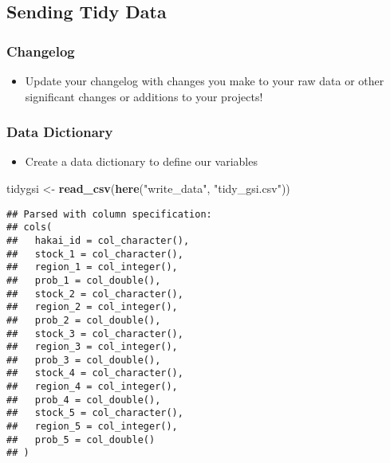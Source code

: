 \documentclass[]{article}
\newenvironment{Shaded}{\begin{snugshade}}{\end{snugshade}}
\newcommand{\KeywordTok}[1]{\textcolor[rgb]{0.13,0.29,0.53}{\textbf{#1}}}
\newcommand{\DataTypeTok}[1]{\textcolor[rgb]{0.13,0.29,0.53}{#1}}
\newcommand{\StringTok}[1]{\textcolor[rgb]{0.31,0.60,0.02}{#1}}
\newcommand{\OperatorTok}[1]{\textcolor[rgb]{0.81,0.36,0.00}{\textbf{#1}}}
\newcommand{\NormalTok}[1]{#1}
\providecommand{\tightlist}{%
  \setlength{\itemsep}{0pt}\setlength{\parskip}{0pt}}
\begin{document}
\begin{Shaded}
\end{Shaded}

\subsection{Sending Tidy Data}\label{sending-tidy-data}

\subsubsection{Changelog}\label{changelog}

\begin{itemize}
\tightlist
\item
  Update your changelog with changes you make to your raw data or other
  significant changes or additions to your projects!
\end{itemize}

\subsubsection{Data Dictionary}\label{data-dictionary}

\begin{itemize}
\tightlist
\item
  Create a data dictionary to define our variables
\end{itemize}

\begin{Shaded}
\begin{Highlighting}[]
\NormalTok{tidygsi <-}\StringTok{ }\KeywordTok{read_csv}\NormalTok{(}\KeywordTok{here}\NormalTok{(}\StringTok{"write_data"}\NormalTok{, }\StringTok{"tidy_gsi.csv"}\NormalTok{))}
\end{Highlighting}
\end{Shaded}

\begin{verbatim}
## Parsed with column specification:
## cols(
##   hakai_id = col_character(),
##   stock_1 = col_character(),
##   region_1 = col_integer(),
##   prob_1 = col_double(),
##   stock_2 = col_character(),
##   region_2 = col_integer(),
##   prob_2 = col_double(),
##   stock_3 = col_character(),
##   region_3 = col_integer(),
##   prob_3 = col_double(),
##   stock_4 = col_character(),
##   region_4 = col_integer(),
##   prob_4 = col_double(),
##   stock_5 = col_character(),
##   region_5 = col_integer(),
##   prob_5 = col_double()
## )
\end{verbatim}
\end{document}
